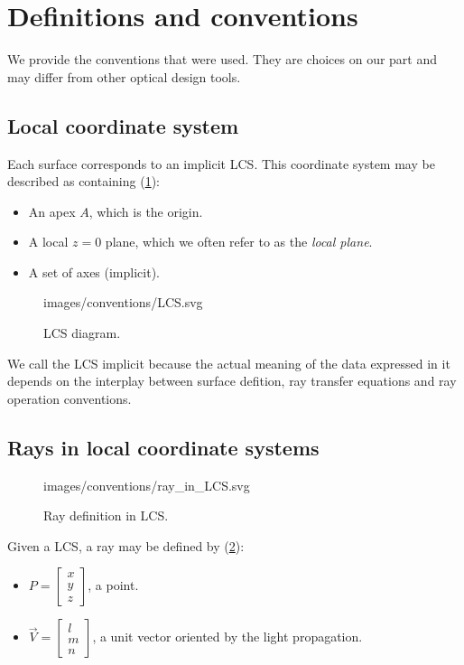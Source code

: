 \section{Definitions and conventions}
We provide the conventions that were used. They are choices
on our part and may differ from other optical design tools.

\subsection{Local coordinate system} \label{sec:LCS}
Each surface corresponds to an implicit \gls{LCS}.
This coordinate system may be described as containing (\cref{fig:LCS}):

\begin{itemize}
\item An apex $A$, which is the origin.
\item A local $z=0$ plane, which we often refer to as the \emph{local plane}.
\item A set of axes (implicit).
\end{itemize}

\begin{figure} \caption{\label{fig:LCS} LCS diagram.}

           {images/conventions/LCS.svg}
\end{figure}

We call the \gls{LCS} implicit because the actual meaning of the data
expressed in it depends on the interplay between surface defition, ray
transfer equations and ray operation conventions.

\subsection{Rays in local coordinate systems}

\begin{figure} \caption{\label{fig:ray-in-LCS} Ray definition
in \gls{LCS}.}

           {images/conventions/ray_in_LCS.svg}
\end{figure}

Given a \gls{LCS}, a ray may be defined by (\cref{fig:ray-in-LCS}):
\begin{itemize}
\item $P = \begin{bmatrix}x \\ y \\ z \end{bmatrix}$, a point.
\item $\overrightarrow{V} = \begin{bmatrix} l \\ m \\ n \end{bmatrix}$, a unit
vector oriented by the light propagation.
\end{itemize}

